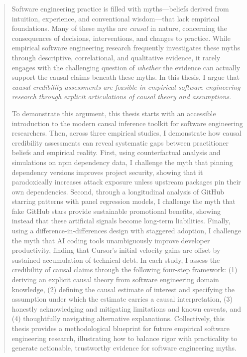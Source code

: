 \documentclass[12pt, openany]{cmuthesis}
\begin{document}
\begin{abstract}
Software engineering practice is filled with myths---beliefs derived from intuition, experience, and conventional wisdom---that lack empirical foundations.
Many of these myths are \emph{causal} in nature, concerning the consequences of decisions, interventions, and changes to practice.
While empirical software engineering research frequently investigates these myths through descriptive, correlational, and qualitative evidence, it rarely engages with the challenging question of \emph{whether} the evidence can actually support the causal claims beneath these myths.
In this thesis, I argue that \emph{causal credibility assessments are feasible in empirical software engineering research through explicit articulations of causal theory and assumptions}.

To demonstrate this argument, this thesis starts with an accessible introduction to the modern causal inference toolkit for software engineering researchers.
Then, across three empirical studies, I demonstrate how causal credibility assessments can reveal systematic gaps between practitioner beliefs and empirical reality. 
First, using counterfactual analysis and simulations on npm dependency data, I challenge the myth that pinning dependency versions improves project security, showing that it paradoxically increases attack exposure unless upstream packages pin their own dependencies. 
Second, through a longitudinal analysis of GitHub starring patterns with panel regression models, I challenge the myth that fake GitHub stars provide sustainable promotional benefits, showing instead that these artificial signals become long-term liabilities. 
Finally, using a difference-in-differences design with staggered adoption, I challenge the myth that AI coding tools unambiguously improve developer productivity, finding that Cursor's initial velocity gains are offset by sustained accumulation of technical debt.
In each study, I assess the credibility of causal claims through the following four-step framework: (1) deriving an explicit causal theory from software engineering domain knowledge, (2) defining the causal estimate of interest and specifying the assumption under which the estimate carries a causal interpretation, (3) honestly acknowledging and mitigating limitations and known caveats, and (4) thoughtfully navigating alternative explanations.
Collectively, this thesis provides a methodological blueprint for future empirical software engineering research, illustrating how to balance rigor with practicality to generate actionable, trustworthy evidence for software engineering myths.
\end{abstract}
\end{document}
